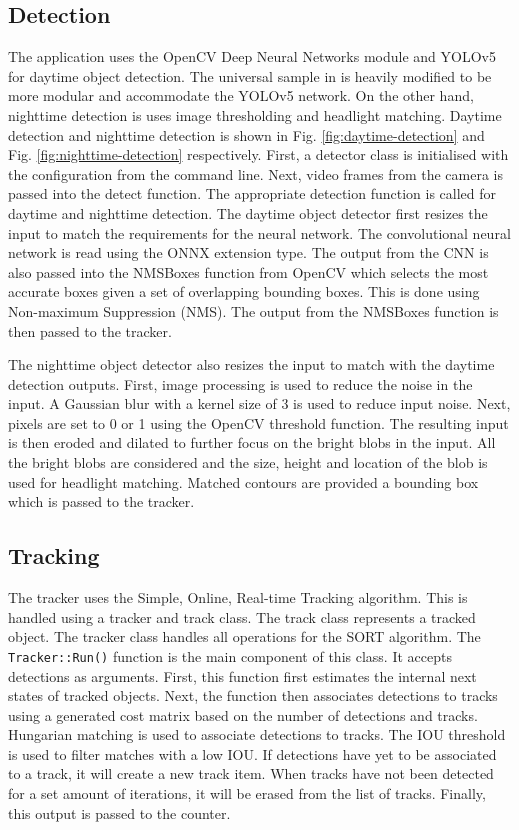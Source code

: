 \documentclass[12pt,a4paper,fleqn]{report}
\begin{document}
\subsection{Detection}
The application uses the OpenCV Deep Neural Networks module and YOLOv5 for daytime object detection.
The universal sample in \cite{opencvyolosample:2022} is heavily modified to be more modular and
accommodate the YOLOv5 network.
On the other hand, nighttime detection is uses image thresholding and headlight matching.
Daytime detection and nighttime detection is shown in Fig. \ref{fig:daytime-detection} and Fig.
\ref{fig:nighttime-detection} respectively.
First, a detector class is initialised with the configuration from the command line. 
Next, video frames from the camera is passed into the detect function. 
The appropriate detection function is called for daytime and nighttime detection.
The daytime object detector first resizes the input to match the requirements for the neural network.
The convolutional neural network is read using the ONNX extension type.
The output from the CNN is also passed into the NMSBoxes function from OpenCV which selects the most 
accurate boxes given a set of overlapping bounding boxes. 
This is done using Non-maximum Suppression (NMS).
The output from the NMSBoxes function is then passed to the tracker.

The nighttime object detector also resizes the input to match with the daytime detection outputs.
First, image processing is used to reduce the noise in the input. 
A Gaussian blur with a kernel size of 3 is used to reduce input noise. 
Next, pixels are set to 0 or 1 using the OpenCV threshold function.
The resulting input is then eroded and dilated to further focus on the bright blobs in the input.
All the bright blobs are considered and the size, height and location of the blob is used for
headlight matching.
Matched contours are provided a bounding box which is passed to the tracker.


\subsection{Tracking}
The tracker uses the Simple, Online, Real-time Tracking algorithm.
This is handled using a tracker and track class. 
The track class represents a tracked object.
The tracker class handles all operations for the SORT algorithm.
The \texttt{Tracker::Run()} function is the main component of this class. 
It accepts detections as arguments. 
First, this function first estimates the internal next states of tracked objects.
Next, the function then associates detections to tracks using a generated cost matrix based on the number
of detections and tracks.
Hungarian matching is used to associate detections to tracks. 
The IOU threshold is used to filter matches with a low IOU.
If detections have yet to be associated to a track, it will create a new track item.
When tracks have not been detected for a set amount of iterations, it will be erased from the list
of tracks.
Finally, this output is passed to the counter.
\end{document}
